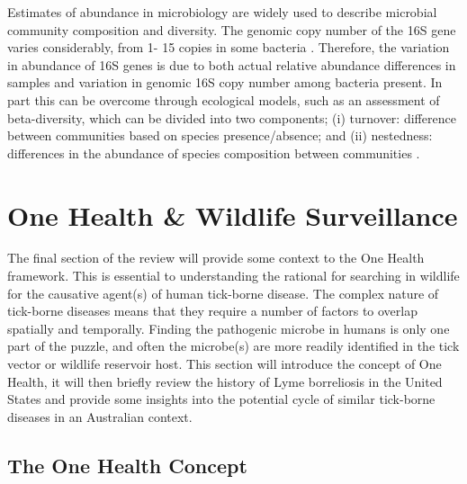 \documentclass[a4paper, nobind]{templates/ociamthesis}
\begin{document}
Estimates of abundance in microbiology are widely used to describe microbial community composition and diversity.
The genomic copy number of the 16S gene varies considerably, from 1- 15 copies in some bacteria \autocite{loucaCorrecting16SRRNA2018}.
Therefore, the variation in abundance of 16S genes is due to both actual relative abundance differences in samples and variation in genomic 16S copy number among bacteria present.
In part this can be overcome through ecological models, such as an assessment of beta-diversity, which can be divided into two components; (i) turnover: difference between communities based on species presence/absence; and (ii) nestedness: differences in the abundance of species composition between communities \autocite{baselgaPartitioningTurnoverNestedness2010,baselgaBetapartPartioningBeta2017}.

\hypertarget{one-health-wildlife-surveillance}{%
\section{One Health \& Wildlife Surveillance}\label{one-health-wildlife-surveillance}}

The final section of the review will provide some context to the One Health framework.
This is essential to understanding the rational for searching in wildlife for the causative agent(s) of human tick-borne disease.
The complex nature of tick-borne diseases means that they require a number of factors to overlap spatially and temporally.
Finding the pathogenic microbe in humans is only one part of the puzzle, and often the microbe(s) are more readily identified in the tick vector or wildlife reservoir host.
This section will introduce the concept of One Health, it will then briefly review the history of Lyme borreliosis in the United States and provide some insights into the potential cycle of similar tick-borne diseases in an Australian context.

\hypertarget{the-one-health-concept}{%
\subsection{The One Health Concept}\label{the-one-health-concept}}
\end{document}
